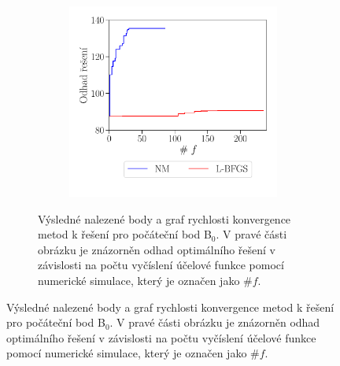 \begin{figure}[H]
\begin{subfigure}[b]{1.0\textwidth}
\begin{subfigure}[b]{0.38\textwidth}
		\includegraphics[width=1.1\textwidth, trim={12mm 0 0 0mm}]{Images/2.pdf}
	\end{subfigure}	
	\caption{Výsledné nalezené body a graf rychlosti konvergence metod k řešení pro počáteční bod B$_0$.  V pravé části obrázku je znázorněn odhad optimálního řešení v závislosti na počtu vyčíslení účelové funkce pomocí numerické simulace, který je označen jako $ \# f $. \vspace{6mm}}
	\end{subfigure}
\end{figure}
